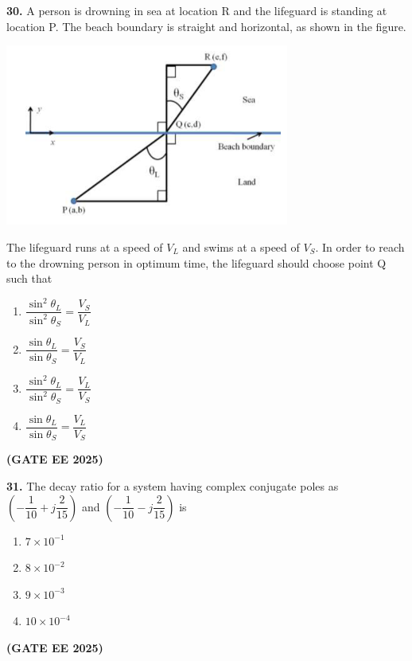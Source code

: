 \documentclass[journal,12pt,onecolumn]{IEEEtran}
\newcommand{\brak}[1]{(#1)}
\begin{document}
\noindent\textbf{30.} A person is drowning in sea at location R and the lifeguard is standing at location P. The beach boundary is straight and horizontal, as shown in the figure.
\begin{center}
\includegraphics[width=0.7\textwidth]{figs/30.png}
\end{center}
The lifeguard runs at a speed of $V_{L}$ and swims at a speed of $V_{S}$. In order to reach to the drowning person in optimum time, the lifeguard should choose point Q such that
\begin{enumerate}
    \item $\dfrac{\sin^{2}\theta_{L}}{\sin^{2}\theta_{S}}=\dfrac{V_{S}}{V_{L}}$
    \item $\dfrac{\sin\theta_{L}}{\sin\theta_{S}}=\dfrac{V_{S}}{V_{L}}$
    \item $\dfrac{\sin^{2}\theta_{L}}{\sin^{2}\theta_{S}}=\dfrac{V_{L}}{V_{S}}$
    \item $\dfrac{\sin\theta_{L}}{\sin\theta_{S}}=\dfrac{V_{L}}{V_{S}}$
\end{enumerate}
\hfill \textbf{\brak{GATE EE 2025}}

\noindent\textbf{31.} The decay ratio for a system having complex conjugate poles as $\brak{-\dfrac{1}{10}+j\dfrac{2}{15}}$ and $\brak{-\dfrac{1}{10}-j\dfrac{2}{15}}$ is
\begin{enumerate}
    \item $7\times10^{-1}$
    \item $8\times10^{-2}$
    \item $9\times10^{-3}$
    \item $10\times10^{-4}$
\end{enumerate}
\hfill \textbf{\brak{GATE EE 2025}}
\end{document}
